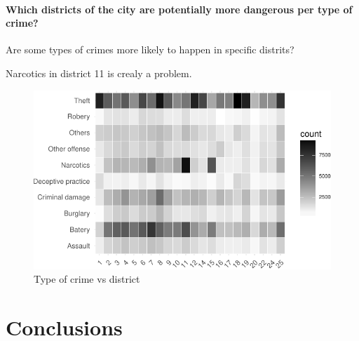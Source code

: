 \documentclass[]{article}
\let\oldparagraph\paragraph
\renewcommand{\paragraph}[1]{\oldparagraph{#1}\mbox{}}
\begin{document}
\paragraph{Which districts of the city are potentially more dangerous
per type of
crime?}\label{which-districts-of-the-city-are-potentially-more-dangerous-per-type-of-crime}

Are some types of crimes more likely to happen in specific distrits?

Narcotics in district 11 is crealy a problem.

\begin{figure}[H]

{\centering \includegraphics{Assessment_1v8_files/figure-latex/fig10-1} 

}

\caption{Type of crime vs district}\label{fig:fig10}
\end{figure}

\section{Conclusions}\label{conclusions}
\end{document}
